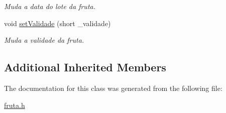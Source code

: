 \begin{DoxyCompactItemize}
\begin{DoxyCompactList}\small\item\em Muda a data do lote da fruta. \end{DoxyCompactList}\item 
void \hyperlink{classFruta_a779eb0307ab1f8e696d94f7420f43dbe}{set\+Validade} (short \+\_\+validade)\hypertarget{classFruta_a779eb0307ab1f8e696d94f7420f43dbe}{}\label{classFruta_a779eb0307ab1f8e696d94f7420f43dbe}

\begin{DoxyCompactList}\small\item\em Muda a validade da fruta. \end{DoxyCompactList}\end{DoxyCompactItemize}
\subsection*{Additional Inherited Members}


The documentation for this class was generated from the following file\+:\begin{DoxyCompactItemize}
\item 
\hyperlink{fruta_8h}{fruta.\+h}\end{DoxyCompactItemize}
